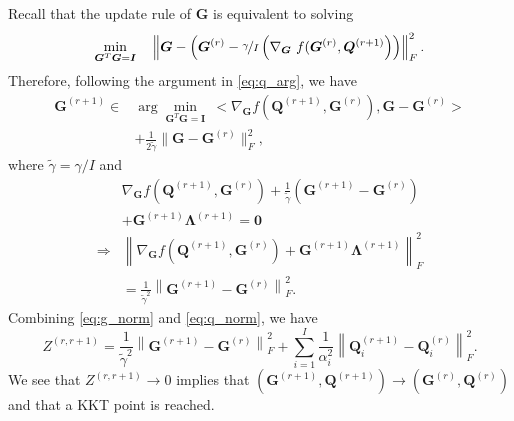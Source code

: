 \documentclass[10pt,journal]{IEEEtran}
\newcommand{\G}{\boldsymbol{G}}
\newcommand{\Q}{\boldsymbol{Q}}
\newcommand{\X}{\boldsymbol{X}}
\begin{document}
Recall that the update rule of $\G$ is equivalent to solving
\begin{equation}\label{eq:G_projgrad}
\begin{aligned}
\min_{\G^T\G=\bm I}\quad \left\|\G - \left(\G^{(r)} -\nicefrac{\gamma}{I} \left(\nabla_{\G}~f(\G^{(r)},\Q^{(r+1)}\right)\right)\right\|_F^2.
\end{aligned}
\end{equation}
Therefore, following the argument in \eqref{eq:q_arg}, we have
\begin{equation}\label{eq:g_arg}
\begin{aligned}
\G^{(r+1)} \in& \arg\min_{\G^T\G={\bm I}}~ <\nabla_{\G}f(\Q^{(r+1)},\G^{(r)}),\G -\G^{(r)}>\\ &+\frac{1}{2\tilde{\gamma}}\|\G-\G^{(r)}\|_F^2,
\end{aligned}
\end{equation}
where $\tilde{\gamma}=\gamma/I$ and
\begin{align}
&\nabla_{\G}f(\Q^{(r+1)},\G^{(r)}) +\frac{1}{\tilde{\gamma}}\left(\G^{(r+1)} -\G^{(r)}\right) \nonumber\\
&+ \G^{(r+1)}{\bm\Lambda}^{(r+1)}={\bm 0} \nonumber\\
\Rightarrow& \left\|\nabla_{\G}f(\Q^{(r+1)},\G^{(r)})+\G^{(r+1)}{\bm \Lambda}^{(r+1)}\right\|_F^2 \nonumber\\& = \frac{1}{\tilde{\gamma}^2}  \left\|\G^{(r+1)} -\G^{(r)}\right\|_F^2. \label{eq:g_norm}
\end{align}
Combining \eqref{eq:g_norm} and \eqref{eq:q_norm}, we have
\begin{equation}
Z^{(r,r+1)} = \frac{1}{\tilde{\gamma}^2}  \left\|\G^{(r+1)} -\G^{(r)}\right\|_F^2 + \sum_{i=1}^I\frac{1}{\alpha_i^2}\left\|\Q_i^{(r+1)}-\Q_i^{(r)}\right\|_F^2.
\end{equation}
We see that $Z^{(r,r+1)}\rightarrow 0$ implies that $(\G^{(r+1)},\Q^{(r+1)})\rightarrow (\G^{(r)},\Q^{(r)})$ and that a KKT point is reached.
\end{document}
